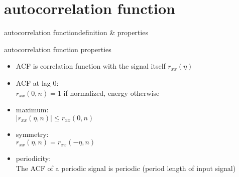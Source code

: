     \section[ACF]{autocorrelation function}
        \begin{frame}{autocorrelation function}{definition \& properties}
            \toremember{}
            \begin{block}{autocorrelation function properties}
                \begin{itemize}
                    \item   ACF is correlation function with the signal itself $r_{xx}(\eta)$
                    \item	{ACF} at lag $0$:\\
                    $r_{xx}(0,n) = 1$ if normalized, energy otherwise
                
                    \item	maximum:\\
                    $|r_{xx}(\eta,n)| \leq r_{xx}(0,n)$ 
                    \item	symmetry:\\
                    $r_{xx}(\eta,n) = r_{xx}(-\eta,n)$
                    \item	periodicity:\\
                    The {ACF} of a periodic signal is periodic (period length of input signal)
                \end{itemize}	
            \end{block}
        \end{frame}	
        
